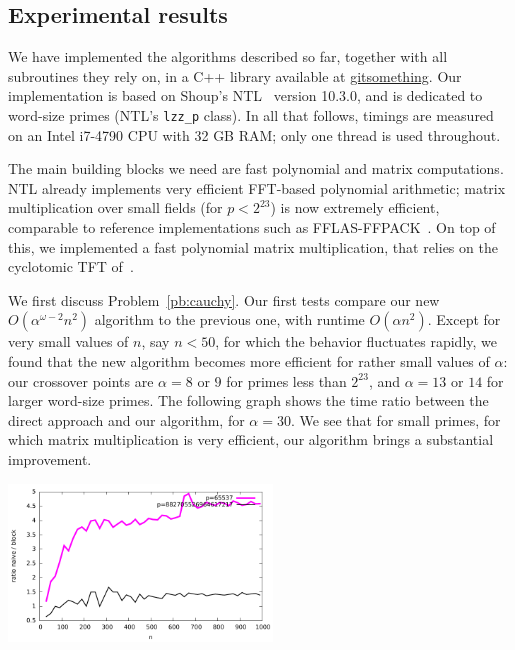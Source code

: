 \documentclass{sig-alternate}
\begin{document}

\subsection{Experimental results}

We have implemented the algorithms described so far, together with all
subroutines they rely on, in a C++ library available at
\url{gitsomething}. Our implementation is based on Shoup's
NTL~\cite{Shoup95,NTL} version 10.3.0, and is dedicated to word-size
primes (NTL's \texttt{lzz\_p} class). In all that follows, timings are
measured on an Intel i7-4790 CPU with 32 GB RAM; only one thread is
used throughout.

The main building blocks we need are fast polynomial and matrix
computations. NTL already implements very efficient FFT-based
polynomial arithmetic; matrix multiplication over small fields (for $p
< 2^{23}$) is now extremely efficient, comparable to reference
implementations such as FFLAS-FFPACK~\cite{fflas-ffpack}. On top of
this, we implemented a fast polynomial matrix multiplication, that
relies on the cyclotomic TFT of~\cite{ArSc15}.

We first discuss Problem~\ref{pb:cauchy}. Our first tests compare our
new $O(\alpha^{\omega-2} n^2)$ algorithm to the previous one, with
runtime $O(\alpha n^2)$. Except for very small values of $n$, say $n <
50$, for which the behavior fluctuates rapidly, we found that the new
algorithm becomes more efficient for rather small values of $\alpha$:
our crossover points are $\alpha=8$ or $9$ for primes less than
$2^{23}$, and $\alpha=13$ or $14$ for larger word-size primes. The
following graph shows the time ratio between the direct approach and
our algorithm, for $\alpha=30$. We see that for small primes, for
which matrix multiplication is very efficient, our algorithm brings a
substantial improvement.

\includegraphics[width=7cm]{ratio-block-eschost-desktop.pdf}
\end{document}
